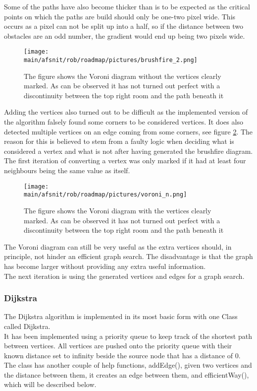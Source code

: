 \documentclass[../../../Main.tex]{subfiles}
\begin{document}
Some of the paths have also become thicker than is to be expected as the critical points on which the paths are build should only be one-two pixel wide.
This occurs as a pixel can not be split up into a half, so if the distance between two obstacles are an odd number, the gradient would end up being two pixels wide.\\
\begin{figure}[H]
  \centering
  \texttt{[image: \\main/afsnit/rob/roadmap/pictures/brushfire\_2.png]}
  \caption{The figure shows the Voroni diagram without the vertices clearly marked. As can be observed it has not turned out perfect with a discontinuity between the top right room and the path beneath it}
  \label{fig:voroni_diagram}
\end{figure}
Adding the vertices also turned out to be difficult as the implemented version of the algorithm falsely found some corners to be considered vertices.
It does also detected multiple vertices on an edge coming from some corners, see figure \ref{fig:voroni_diagram_nodes}.
The reason for this is believed to stem from a faulty logic when deciding what is considered a vertex and what is not after having generated the brushfire diagram. The first iteration of converting  a vertex was only marked if it had at least four neighbours being the same value as itself.
\begin{figure}[H]
  \centering
  \texttt{[image: \\main/afsnit/rob/roadmap/pictures/voroni\_n.png]}
  \caption{The figure shows the Voroni diagram with the vertices clearly marked. As can be observed it has not turned out perfect with a discontinuity between the top right room and the path beneath it}
  \label{fig:voroni_diagram_nodes}
\end{figure}


The Voroni diagram can still be very useful as the extra vertices should, in principle, not hinder an efficient graph search. The disadvantage is that the graph has become larger without providing any extra useful information.\\

The next iteration is using the generated vertices and edges for a graph search.
\subsubsection*{Dijkstra}
The Dijkstra algorithm is implemented in its most basic form with one Class called Dijkstra. \\
It has been implemented using a priority queue to keep track of the shortest path between vertices.
All vertices are pushed onto the priority queue with their known distance set to infinity beside the source node that has a distance of 0.
The class has another couple of help functions, addEdge(), given two vertices and the distance between them, it creates an edge between them, and efficientWay(), which will be described below. \\
\end{document}
